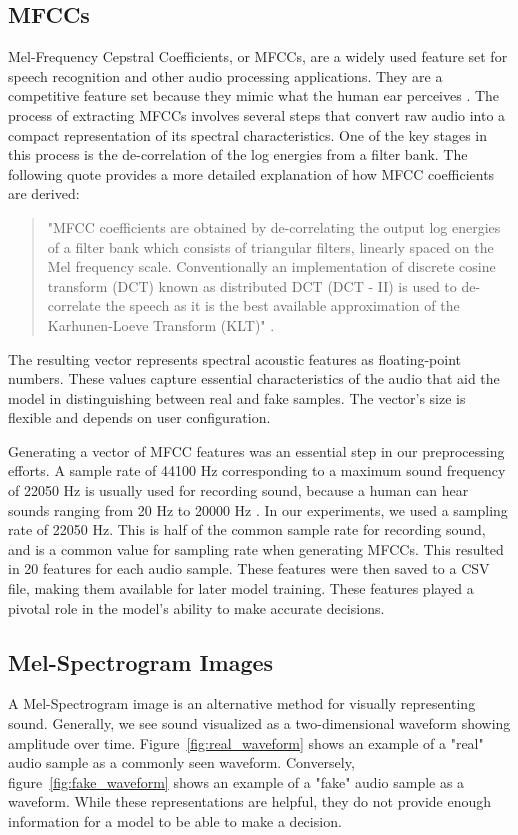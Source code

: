 \documentclass[conference]{IEEEtran}
\begin{document}
\subsection{MFCCs}

Mel-Frequency Cepstral Coefficients, or MFCCs, are a widely used feature set for speech recognition and other audio processing applications. They are a competitive feature set because they mimic what the human ear perceives \cite{9996362}. The process of extracting MFCCs involves several steps that convert raw audio into a compact representation of its spectral characteristics. One of the key stages in this process is the de-correlation of the log energies from a filter bank. The following quote provides a more detailed explanation of how MFCC coefficients are derived:

\begin{quote}
  "MFCC coefficients are obtained by de-correlating the output log
  energies of a filter bank which consists of triangular filters, linearly spaced on the Mel frequency scale.
  Conventionally an implementation of discrete cosine transform (DCT) known as distributed DCT (DCT - II) is
  used to de-correlate the speech as it is the best available approximation of the Karhunen-Loeve Transform
  (KLT)" \cite{5709752}.
\end{quote}

The resulting vector represents spectral acoustic features as floating-point numbers. These values capture essential characteristics of the audio that aid the model in distinguishing between real and fake samples. The vector's size is flexible and depends on user configuration. 

Generating a vector of MFCC features was an essential step in our preprocessing efforts. A sample rate of 44100 Hz corresponding to a maximum sound frequency of 22050 Hz is usually used for recording sound, because a human can hear sounds ranging from 20 Hz to 20000 Hz \cite{9252126}. In our experiments, we used a sampling rate of 22050 Hz. This is half of the common sample rate for recording sound, and is a common value for sampling rate when generating MFCCs. This resulted in 20 features for each audio sample. These features were then saved to a CSV file, making them available for later model training. These features played a pivotal role in the model's ability to make accurate decisions.

\subsection{Mel-Spectrogram Images}
A Mel-Spectrogram image is an alternative method for visually representing sound. Generally, we see sound visualized as a two-dimensional waveform showing amplitude over time. Figure~\ref{fig:real_waveform} shows an example of a "real" audio sample as a commonly seen waveform. Conversely, figure~\ref{fig:fake_waveform} shows an example of a "fake" audio sample as a waveform. While these representations are helpful, they do not provide enough information for a model to be able to make a decision. 
\end{document}
